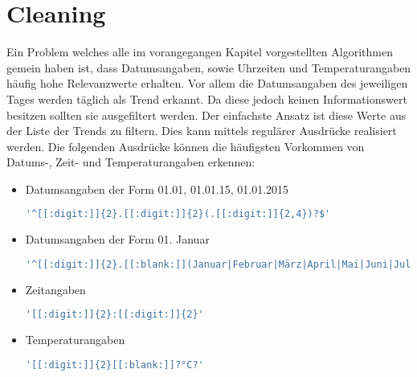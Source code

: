 \chapter{Cleaning}

Ein Problem welches alle im vorangegangen Kapitel vorgestellten Algorithmen gemein haben ist, dass Datumsangaben, sowie Uhrzeiten und Temperaturangaben häufig hohe Relevanzwerte erhalten. Vor allem die Datumsangaben des jeweiligen Tages werden täglich als Trend erkannt. Da diese jedoch keinen Informationswert besitzen sollten sie ausgefiltert werden. Der einfachste Ansatz ist diese Werte aus der Liste der Trends zu filtern. Dies kann mittels regulärer Ausdrücke realisiert werden. Die folgenden Ausdrücke können die häufigsten Vorkommen von Datums-, Zeit- und Temperaturangaben erkennen:

\begin{itemize}
	\item{Datumsangaben der Form 01.01, 01.01.15, 01.01.2015}\\
	\begin{lstlisting}[language=sql]
'^[[:digit:]]{2}.[[:digit:]]{2}(.[[:digit:]]{2,4})?$'
	\end{lstlisting}
\end{itemize}

\begin{itemize}
	\item{Datumsangaben der Form 01. Januar}\\
	\begin{lstlisting}[language=sql]
'^[[:digit:]]{2}.[[:blank:]](Januar|Februar|März|April|Mai|Juni|Juli|August|September|Oktober|November|Dezember)$'
	\end{lstlisting}
\end{itemize}

\begin{itemize}
	\item{Zeitangaben}\\
	\begin{lstlisting}[language=sql]
'[[:digit:]]{2}:[[:digit:]]{2}'
	\end{lstlisting}
\end{itemize}

\begin{itemize}
	\item{Temperaturangaben}\\
	\begin{lstlisting}[language=sql]
'[[:digit:]]{2}[[:blank:]]?°C?'
	\end{lstlisting}
\end{itemize}

